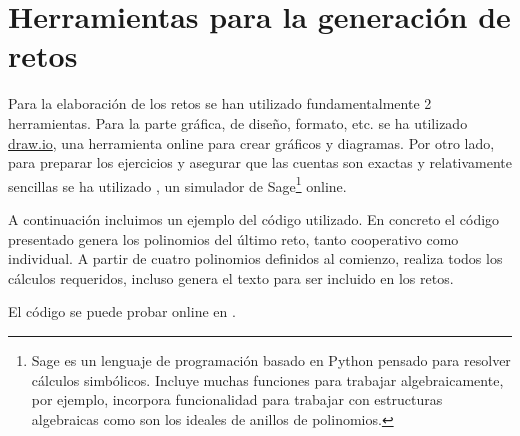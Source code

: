 

\section{Herramientas para la generación de retos}

Para la elaboración de los retos se han utilizado fundamentalmente 2 herramientas.
%
Para la parte gráfica, de diseño, formato, etc. se ha utilizado \url{draw.io}, una herramienta online para crear gráficos y diagramas.
%
Por otro lado, para preparar los ejercicios y asegurar que las cuentas son exactas y relativamente sencillas se ha utilizado , un simulador de Sage\footnote{Sage es un lenguaje de programación basado en Python pensado para resolver cálculos simbólicos.
%
Incluye muchas funciones para trabajar algebraicamente, por ejemplo, incorpora funcionalidad para trabajar con estructuras algebraicas como son los ideales de anillos de polinomios.
} online.

A continuación incluimos un ejemplo del código utilizado. 
%
En concreto el código presentado genera los polinomios del último reto, tanto cooperativo como individual.
%
A partir de cuatro polinomios definidos al comienzo, realiza todos los cálculos requeridos, incluso genera el texto para ser incluido en los retos.

El código se puede probar online en  \citep{Sage}.


